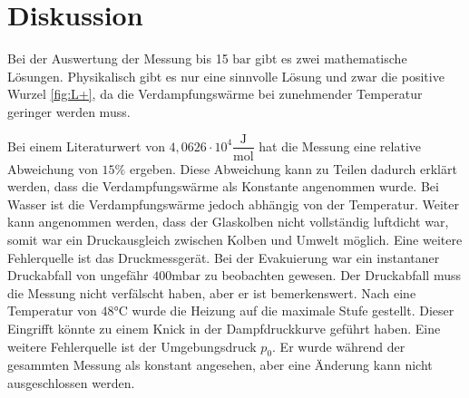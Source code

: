 \section{Diskussion}
\label{sec:Diskussion}
Bei der Auswertung der Messung bis 15 $\unit{\bar}$ gibt es zwei mathematische Lösungen. Physikalisch gibt es nur eine sinnvolle Lösung und zwar die positive Wurzel \autoref{fig:L+}, da die Verdampfungswärme bei zunehmender Temperatur geringer werden muss. 

Bei einem Literaturwert von ${4,0626} \cdot 10^4 \dfrac{\unit{\joule}}{\unit{\mol}}$ \cite{chemiede} hat die Messung eine relative Abweichung von $15\%$ ergeben.
Diese Abweichung kann zu Teilen dadurch erklärt werden, dass die Verdampfungswärme als Konstante angenommen wurde.
Bei Wasser ist die Verdampfungswärme jedoch abhängig von der Temperatur.
Weiter kann angenommen werden, dass der Glaskolben nicht vollständig luftdicht war, somit war ein Druckausgleich zwischen Kolben und Umwelt möglich.
Eine weitere Fehlerquelle ist das Druckmessgerät. Bei der Evakuierung war ein instantaner Druckabfall von ungefähr $400 \unit{\milli\bar}$ zu beobachten gewesen.
Der Druckabfall muss die Messung nicht verfälscht haben, aber er ist bemerkenswert.
Nach eine Temperatur von $48 \unit{\celsius}$ wurde die Heizung auf die maximale Stufe gestellt. Dieser Eingrifft könnte zu einem Knick in der Dampfdruckkurve geführt haben.
Eine weitere Fehlerquelle ist der Umgebungsdruck $p_0$. Er wurde während der gesammten Messung als konstant angesehen, aber eine Änderung kann nicht ausgeschlossen werden.